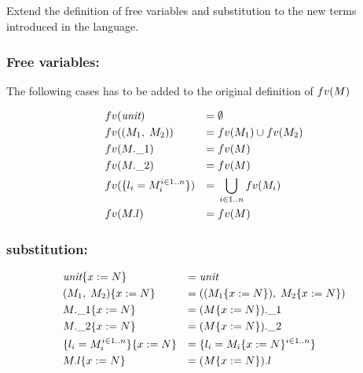 \subsection{}

Extend the definition of free variables and substitution to the new terms introduced in the
language.

\subsubsection*{Free variables:}

The following cases has to be added to the original definition of $fv(M)$

\begin{align*}
  & fv(\emph{unit})                       & =\; & \emptyset                     \\
  & fv((M_1,\;M_2))             & =\; & fv(M_1) \cup fv(M_2)        \\
  & fv(M.\_1)                     & =\; & fv(M)                        \\
  & fv(M.\_2)                     & =\; & fv(M)                        \\
  & fv(\{l_i = M_i^{i\in 1..n}\}) & =\; & \bigcup_{i \in 1..n} fv(M_i) \\
  & fv(M.l)                  & =\; & fv(M)
\end{align*}

\subsubsection*{substitution:}

\begin{align*}
  & \emph{unit}\{x:=N\}                       & =\; & \emph{unit}                                     \\
  & (M_1,\;M_2)\{x:=N\}             & =\; & ((M_1\{x:=N\}),\;M_2\{x:=N\}) \\
  & M.\_1\{x:=N\}                     & =\; & (M\{x:=N\}).\_1                     \\
  & M.\_2\{x:=N\}                     & =\; & (M\{x:=N\}).\_2                     \\
  & \{l_i = M_i^{i\in 1..n}\}\{x:=N\} & =\; & \{l_i = M_i\{x:=N\}^{i\in 1..n}\}   \\
  & M.l\{x:=N\}                  & =\; & (M\{x:=N\}).l
\end{align*}
